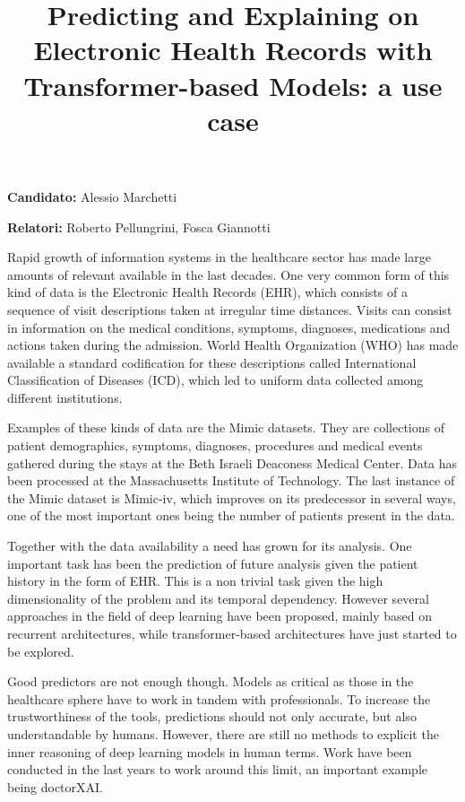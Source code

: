 \documentclass[]{marticle}
\title{\textbf{\huge Predicting and Explaining on Electronic Health Records  with Transformer-based Models: a use case}}
\date{}
\author{}
\begin{document}
\maketitle

\textbf{Candidato:} Alessio Marchetti

\textbf{Relatori:} Roberto Pellungrini, Fosca Giannotti
\vspace{0.4cm}

Rapid growth of information systems in the healthcare sector has made large amounts of relevant
available in the last decades. One very common form of this kind of data is the Electronic Health
Records (EHR), which consists of a sequence of visit descriptions taken at irregular time
distances. Visits can consist in information on the medical conditions, symptoms, diagnoses,
medications and actions taken during the admission. World Health Organization (WHO) has made
available a standard codification for these descriptions called International Classification of
Diseases (ICD), which led to uniform data collected among different institutions.

Examples of these kinds of data are the Mimic datasets. They are collections of patient
demographics, symptoms, diagnoses, procedures and medical events gathered during the stays at the
Beth Israeli Deaconess Medical Center. Data has been processed at the Massachusetts Institute of
Technology. The last instance of the Mimic dataset is Mimic-iv, which improves on its predecessor in
several ways, one of the most important ones being the number of patients present in the data.

Together with the data availability a need has grown for its analysis. One important task has been
the prediction of future analysis given the patient history in the form of EHR. This is a non
trivial task given the high dimensionality of the problem and its temporal dependency. However
several approaches in the field of deep learning have been proposed, mainly based on recurrent
architectures, while transformer-based architectures have just started to be explored.

Good predictors are not enough though. Models as critical as those in the healthcare sphere have to
work in tandem with professionals. To increase the trustworthiness of the tools, predictions should
not only accurate, but also understandable by humans. However, there are still no methods to explicit
the inner reasoning of deep learning models in human terms. Work have been conducted in the last
years to work around this limit, an important example being doctorXAI. 
\end{document}
